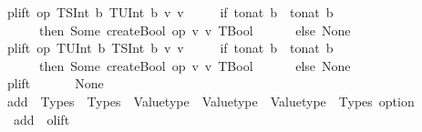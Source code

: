 \begin{isabellebody}
{\isacharbar}{\kern0pt}\ {\isachardoublequoteopen}plift\ op\ {\isacharparenleft}{\kern0pt}TSInt\ b{}{\isacharparenright}{\kern0pt}\ {\isacharparenleft}{\kern0pt}TUInt\ b{}{\isacharparenright}{\kern0pt}\ v{}\ v{}\ {\isacharequal}{\kern0pt}\isanewline
\ \ \ \ {\isacharparenleft}{\kern0pt}if\ to{\isacharunderscore}{\kern0pt}nat\ b{}\ {\isacharless}{\kern0pt}\ to{\isacharunderscore}{\kern0pt}nat\ b{}\isanewline
\ \ \ \ \ \ then\ Some\ {\isacharparenleft}{\kern0pt}createBool\ {\isacharparenleft}{\kern0pt}op\ {\isasymlceil}v{}{\isasymrceil}\ {\isasymlceil}v{}{\isasymrceil}{\isacharparenright}{\kern0pt}{\isacharcomma}{\kern0pt}\ TBool{\isacharparenright}{\kern0pt}\isanewline
\ \ \ \ \ \ else\ None{\isacharparenright}{\kern0pt}{\isachardoublequoteclose}\isanewline
{\isacharbar}{\kern0pt}\ {\isachardoublequoteopen}plift\ op\ {\isacharparenleft}{\kern0pt}TUInt\ b{}{\isacharparenright}{\kern0pt}\ {\isacharparenleft}{\kern0pt}TSInt\ b{}{\isacharparenright}{\kern0pt}\ v{}\ v{}\ {\isacharequal}{\kern0pt}\isanewline
\ \ \ \ {\isacharparenleft}{\kern0pt}if\ to{\isacharunderscore}{\kern0pt}nat\ b{}\ {\isacharless}{\kern0pt}\ to{\isacharunderscore}{\kern0pt}nat\ b{}\isanewline
\ \ \ \ \ \ then\ Some\ {\isacharparenleft}{\kern0pt}createBool\ {\isacharparenleft}{\kern0pt}op\ {\isasymlceil}v{}{\isasymrceil}\ {\isasymlceil}v{}{\isasymrceil}{\isacharparenright}{\kern0pt}{\isacharcomma}{\kern0pt}\ TBool{\isacharparenright}{\kern0pt}\isanewline
\ \ \ \ \ \ else\ None{\isacharparenright}{\kern0pt}{\isachardoublequoteclose}\ \isanewline
{\isacharbar}{\kern0pt}\ {\isachardoublequoteopen}plift\ {\isacharunderscore}{\kern0pt}\ {\isacharunderscore}{\kern0pt}\ {\isacharunderscore}{\kern0pt}\ {\isacharunderscore}{\kern0pt}\ {\isacharunderscore}{\kern0pt}\ {\isacharequal}{\kern0pt}\ None{\isachardoublequoteclose}\isanewline
\isanewline
\isanewline
{}\isamarkupfalse%
\ add\ {\isacharcolon}{\kern0pt}{\isacharcolon}{\kern0pt}\ {\isachardoublequoteopen}Types\ {\isasymRightarrow}\ Types\ {\isasymRightarrow}\ Valuetype\ {\isasymRightarrow}\ Valuetype\ {\isasymRightarrow}\ {\isacharparenleft}{\kern0pt}Valuetype\ {\isacharasterisk}{\kern0pt}\ Types{\isacharparenright}{\kern0pt}\ option{\isachardoublequoteclose}\isanewline
{}\isanewline
\ \ {\isachardoublequoteopen}add\ {\isacharequal}{\kern0pt}\ olift\ {\isacharparenleft}{\kern0pt}{\isacharplus}{\kern0pt}{\isacharparenright}{\kern0pt}{\isachardoublequoteclose}\isanewline

\end{isabellebody}
